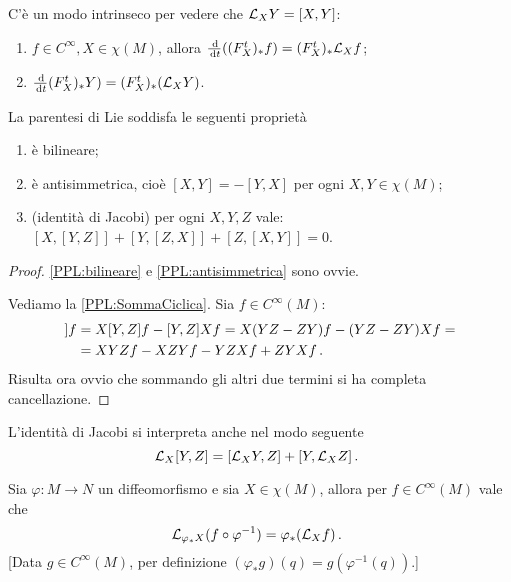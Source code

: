 \begin{remark}
	C'è un modo intrinseco per vedere che $\mathcal L_XY=[X,Y]$:
	\begin{enumerate}
	 \item $f\in C^\infty, X\in\chi(M)$, allora $\frac {\,\mathrm d}{\,\mathrm d t} ((F_X^t)_*f)=(F_X^t)_*\mathcal L_Xf$;
	 \item $\frac{\,\mathrm d}{\,\mathrm d t} (F_X^t)_*Y)=(F_X^t)_*(\mathcal L_XY)$.
	\end{enumerate}
\end{remark}

\begin{proposition}\label{prop:ProprietaParentesiLie}
	La parentesi di Lie soddisfa le seguenti proprietà
	\begin{enumerate}
	 \item è bilineare; \label{PPL:bilineare}
	 \item è antisimmetrica, cioè $[X,Y]=-[Y,X]$ per ogni $X,Y\in\chi(M)$; \label{PPL:antisimmetrica}
	 \item (identità di Jacobi) per ogni $X,Y,Z$ vale: \\
	 $[X,[Y,Z]]+[Y,[Z,X]]+[Z,[X,Y]]=0$. \label{PPL:SommaCiclica}
	\end{enumerate}
\end{proposition}

\begin{proof}
	\ref{PPL:bilineare} e \ref{PPL:antisimmetrica} sono ovvie.
	
	Vediamo la \ref{PPL:SommaCiclica}. Sia $f\in C^\infty(M)$:
	\begin{align*}
		[X,[Y,Z]]f&=X[Y,Z]f-[Y,Z]Xf=X(YZ-ZY)f-(YZ-ZY)Xf=\\
		&= XYZf-XZYf-YZXf+ZYXf\punto
	\end{align*}
	Risulta ora ovvio che sommando gli altri due termini si ha completa cancellazione.
\end{proof}

\begin{remark}
	L'identità di Jacobi si interpreta anche nel modo seguente
	\begin{equation*}
		\mathcal L_X[Y,Z]=[\mathcal L_XY,Z]+[Y,\mathcal L_XZ]\, \text{. }
	\end{equation*}
\end{remark}


\begin{lemma}\label{lem:PushFunzioni}
	Sia $\varphi:M\to N$ un diffeomorfismo e sia $X\in\chi(M)$, allora per $f\in C^\infty(M)$ vale che
	\begin{equation*}
		\mathcal L_{\varphi_*X}(f\circ \varphi^{-1})=\varphi_*(\mathcal L_Xf)\, \text{. }
	\end{equation*}
	[Data $g\in C^\infty(M)$, per definizione $(\varphi_*g)(q)=g(\varphi^{-1}(q)).$]
\end{lemma}

